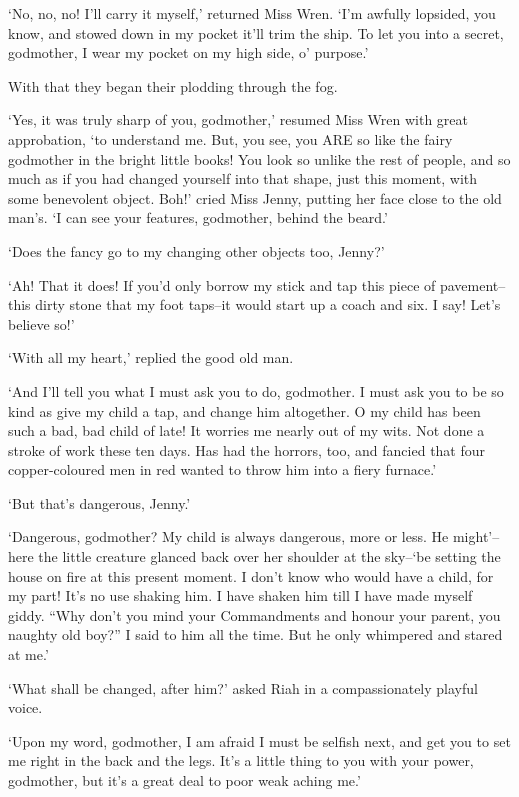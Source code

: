 ‘No, no, no! I’ll carry it myself,’ returned Miss Wren. ‘I’m awfully
lopsided, you know, and stowed down in my pocket it’ll trim the ship. To
let you into a secret, godmother, I wear my pocket on my high side, o’
purpose.’

With that they began their plodding through the fog.

‘Yes, it was truly sharp of you, godmother,’ resumed Miss Wren with
great approbation, ‘to understand me. But, you see, you ARE so like the
fairy godmother in the bright little books! You look so unlike the rest
of people, and so much as if you had changed yourself into that shape,
just this moment, with some benevolent object. Boh!’ cried Miss Jenny,
putting her face close to the old man’s. ‘I can see your features,
godmother, behind the beard.’

‘Does the fancy go to my changing other objects too, Jenny?’

‘Ah! That it does! If you’d only borrow my stick and tap this piece of
pavement--this dirty stone that my foot taps--it would start up a coach
and six. I say! Let’s believe so!’

‘With all my heart,’ replied the good old man.

‘And I’ll tell you what I must ask you to do, godmother. I must ask you
to be so kind as give my child a tap, and change him altogether. O my
child has been such a bad, bad child of late! It worries me nearly
out of my wits. Not done a stroke of work these ten days. Has had the
horrors, too, and fancied that four copper-coloured men in red wanted to
throw him into a fiery furnace.’

‘But that’s dangerous, Jenny.’

‘Dangerous, godmother? My child is always dangerous, more or less. He
might’--here the little creature glanced back over her shoulder at the
sky--‘be setting the house on fire at this present moment. I don’t know
who would have a child, for my part! It’s no use shaking him. I have
shaken him till I have made myself giddy. “Why don’t you mind your
Commandments and honour your parent, you naughty old boy?” I said to him
all the time. But he only whimpered and stared at me.’

‘What shall be changed, after him?’ asked Riah in a compassionately
playful voice.

‘Upon my word, godmother, I am afraid I must be selfish next, and get
you to set me right in the back and the legs. It’s a little thing to you
with your power, godmother, but it’s a great deal to poor weak aching
me.’

